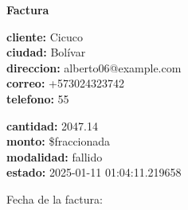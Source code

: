 \documentclass{article}
\begin{document}
\begin{center}
    {\LARGE \textbf{Factura}}\\[1cm]
\end{center}

\textbf{cliente:} Cicuco \\
\textbf{ciudad:} Bolívar \\
\textbf{direccion:} alberto06@example.com \\
\textbf{correo:} +573024323742 \\
\textbf{telefono:} 55 \\

\vspace{0.5cm}

\textbf{cantidad:} 2047.14 \\
\textbf{monto:} \$fraccionada \\
\textbf{modalidad:} fallido \\
\textbf{estado:} 2025-01-11 01:04:11.219658 \\

\vspace{1cm}

Fecha de la factura: 
\end{document}
